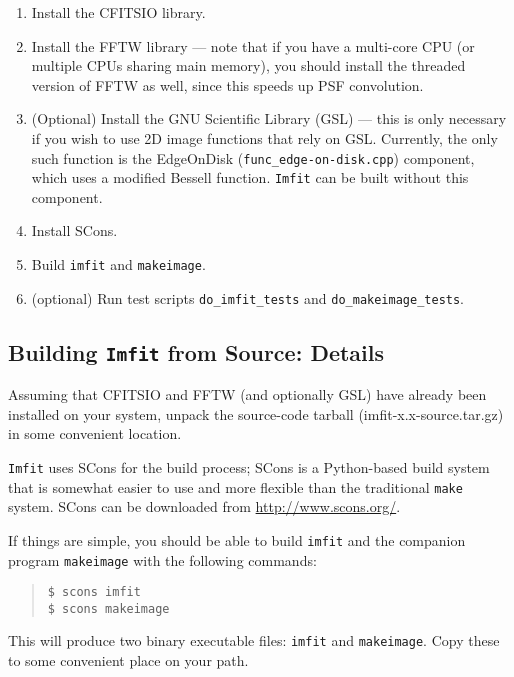 \documentclass[10pt]{article}
\newcommand{\imfit}{\texttt{imfit}}
\newcommand{\Imfit}{\texttt{Imfit}}
\newcommand{\makeimage}{\texttt{makeimage}}
\begin{document}
\begin{enumerate}
\item Install the CFITSIO library.

\item Install the FFTW library --- note that if you have a multi-core CPU (or
multiple CPUs sharing main memory), you should install the threaded version of
FFTW as well, since this speeds up PSF convolution.

\item (Optional) Install the GNU Scientific Library (GSL) --- this is only necessary
if you wish to use 2D image functions that rely on GSL.  Currently, the only
such function is the EdgeOnDisk (\texttt{func\_edge-on-disk.cpp}) component, which
uses a modified Bessell function. \Imfit{} can be built without this component.

\item Install SCons.

\item Build \imfit{} and \makeimage.

\item (optional) Run test scripts \texttt{do\_imfit\_tests} and \texttt{do\_makeimage\_tests}.

\end{enumerate}

\subsection{Building \Imfit{} from Source: Details}\label{sec:build}

Assuming that CFITSIO and FFTW (and optionally GSL) have already been installed
on your system, unpack the source-code tarball (imfit-x.x-source.tar.gz) in some convenient
location.

\Imfit{} uses SCons for the build process; SCons is a Python-based build system
that is somewhat easier to use and more flexible than the traditional \texttt{make}
system. SCons can be downloaded from \url{http://www.scons.org/}.

If things are simple, you should be able to build \imfit{} and the companion
program \makeimage{} with the following commands:
\begin{quote}
\texttt{\$ scons imfit} \\
\texttt{\$ scons makeimage}
\end{quote}
This will produce two binary executable files: \imfit{} and \makeimage{}. Copy
these to some convenient place on your path.
\end{document}
